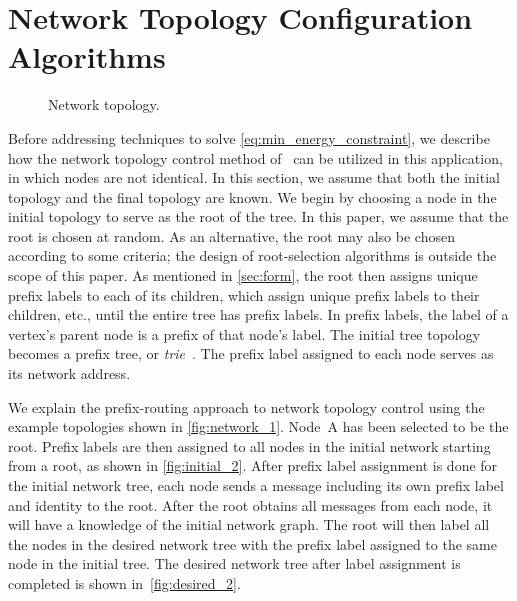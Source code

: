 \documentclass[10pt,conference]{IEEEtran}
\begin{document}
\section{Network Topology Configuration Algorithms}
\label{sec:network}
\begin{figure}[t]
\centering
{}
\caption{Network topology.}
\label{fig:network_1}
\end{figure}

Before addressing techniques to solve
\eqref{eq:min_energy_constraint}, we describe how the network topology
control method of~\cite{BomMILCOM11} can be utilized in this
application, in which nodes are not identical.  In this section, we
assume that both the initial topology  and the final
topology  are known.  We begin by choosing a node in
the initial topology to serve as the root of the tree.  In this paper,
we assume that the root is chosen at random.  As an alternative, the
root may also be chosen according to some criteria; the design of
root-selection algorithms is outside the scope of this paper.  As
mentioned in \autoref{sec:form}, the root then assigns unique prefix
labels to each of its children, which assign unique prefix labels to
their children, etc., until the entire tree has prefix labels.  In
prefix labels, the label of a vertex's parent node is a prefix of that
node's label.  The initial tree topology  becomes a
prefix tree, or {\it trie}~\cite{CLRbook,Drozdek,Horowitz}.  The
prefix label assigned to each node serves as its network address.


We explain the prefix-routing approach to network topology control
using the example topologies shown in \autoref{fig:network_1}.  Node~A
has been selected to be the root.  Prefix labels are then assigned to
all nodes in the initial network starting from a root, as shown in
\autoref{fig:initial_2}.  After prefix label assignment is done for
the initial network tree, each node sends a message including its own
prefix label and identity to the root. After the root obtains all
messages from each node, it will have a knowledge of the initial
network graph.  The root will then label all the nodes in the desired
network tree with the prefix label assigned to the same node in the
initial tree.  The desired network tree after label assignment is
completed is shown in~\autoref{fig:desired_2}.
\end{document}
